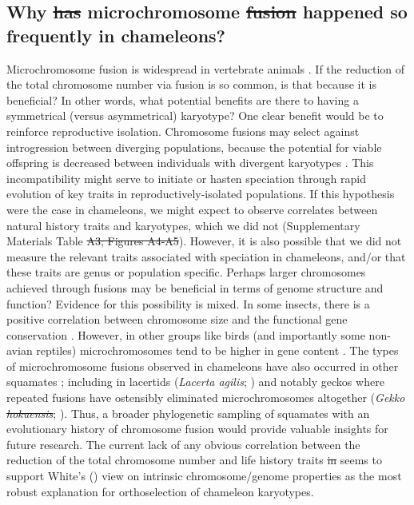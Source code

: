 \documentclass[a4paper, 12pt]{article}
\providecommand{\DIFadd}[1]{{\protect\color{blue}\uwave{#1}}} %
\providecommand{\DIFdel}[1]{{\protect\color{red}\sout{#1}}}                      %
\providecommand{\DIFaddbegin}{} %
\providecommand{\DIFaddend}{} %
\providecommand{\DIFdelbegin}{} %
\providecommand{\DIFdelend}{} %
\newcommand{\DIFscaledelfig}{0.5}
\newlength{\DIFdelgraphicswidth} %
\newlength{\DIFdelgraphicsheight} %
\newcommand{\DIFaddincludegraphics}[2][]{{\color{blue}\fbox{\DIFOincludegraphics[#1]{#2}}}} %
\newcommand{\DIFdelincludegraphics}[2][]{%
\sbox{\DIFdelgraphicsbox}{\DIFOincludegraphics[#1]{#2}}%
\settoboxwidth{\DIFdelgraphicswidth}{\DIFdelgraphicsbox} %
\settoboxtotalheight{\DIFdelgraphicsheight}{\DIFdelgraphicsbox} %
\scalebox{\DIFscaledelfig}{%
\parbox[b]{\DIFdelgraphicswidth}{\usebox{\DIFdelgraphicsbox}\\[-\baselineskip] \rule{\DIFdelgraphicswidth}{0em}}\llap{\resizebox{\DIFdelgraphicswidth}{\DIFdelgraphicsheight}{%
\setlength{\unitlength}{\DIFdelgraphicswidth}%
\begin{picture}(1,1)%
\thicklines\linethickness{2pt} %
{\color[rgb]{1,0,0}\put(0,0){\framebox(1,1){}}}%
{\color[rgb]{1,0,0}\put(0,0){\line( 1,1){1}}}%
{\color[rgb]{1,0,0}\put(0,1){\line(1,-1){1}}}%
\end{picture}%
}\hspace*{3pt}}} %
} %
\DeclareRobustCommand{\DIFaddbegin}{\DIFOaddbegin \let\includegraphics\DIFaddincludegraphics} %
\DeclareRobustCommand{\DIFaddend}{\DIFOaddend \let\includegraphics\DIFOincludegraphics} %
\DeclareRobustCommand{\DIFdelbegin}{\DIFOdelbegin \let\includegraphics\DIFdelincludegraphics} %
\DeclareRobustCommand{\DIFdelend}{\DIFOaddend \let\includegraphics\DIFOincludegraphics} %
\begin{document}
\subsection{Why \DIFdelbegin \DIFdel{has }\DIFdelend \DIFaddbegin \DIFadd{have }\DIFaddend microchromosome \DIFdelbegin \DIFdel{fusion }\DIFdelend \DIFaddbegin \DIFadd{fusions }\DIFaddend happened so frequently in chameleons?}
Microchromosome fusion is widespread in vertebrate animals \citep{waters2021microchromosomes}. 
If the reduction of the total chromosome number via fusion is so common, is that because it is beneficial? In other words, what potential benefits are there to having a symmetrical (versus asymmetrical) karyotype? 
One clear benefit would be to reinforce reproductive isolation. 
Chromosome fusions may select against introgression between diverging populations, because the potential for viable offspring is decreased between individuals with divergent karyotypes \citep{cicconardi2021chromosome}.
This incompatibility might serve to initiate or hasten speciation through rapid evolution of key traits in reproductively-isolated populations. If this hypothesis were the case in chameleons, we might expect to observe correlates between natural history traits and karyotypes, which we did not (Supplementary Materials Table \DIFdelbegin \DIFdel{A3; Figures A4-A5}\DIFdelend \DIFaddbegin \DIFadd{A4; Figures A8-A9}\DIFaddend ). 
However, it is also possible that we did not measure the relevant traits associated with speciation in chameleons, and/or that these traits are genus or population specific.
Perhaps larger chromosomes achieved through fusions may be beneficial in terms of genome structure and function? Evidence for this possibility is mixed. In some insects, there is a positive correlation between chromosome size and the functional gene conservation \citep{cicconardi2021chromosome}. 
However, in other groups like birds (and importantly some non-avian reptiles) microchromosomes tend to be higher in gene content \citep{waters2021microchromosomes}.
The types of microchromosome fusions observed in chameleons have also occurred in other squamates \citep{deakin2016anchoring}; including in lacertids (\textit{Lacerta agilis}; \citealt{srikulnath2014identification}) and notably geckos where repeated fusions have ostensibly eliminated microchromosomes altogether (\textit{Gekko \DIFdelbegin \DIFdel{hokuensis}\DIFdelend \DIFaddbegin \DIFadd{hokouensis}\DIFaddend }; \citealt{srikulnath2015karyotype}). 
Thus, a broader phylogenetic sampling of squamates with an evolutionary history of chromosome fusion would provide valuable insights for future research. 
The current lack of any obvious correlation between the reduction of the total chromosome number and life history traits \DIFdelbegin \DIFdel{in }\DIFdelend seems to support White's (\citeyear{white1973,white1975chromosome}) view on intrinsic chromosome/genome properties as the most robust explanation for orthoselection of chameleon karyotypes.
\end{document}

